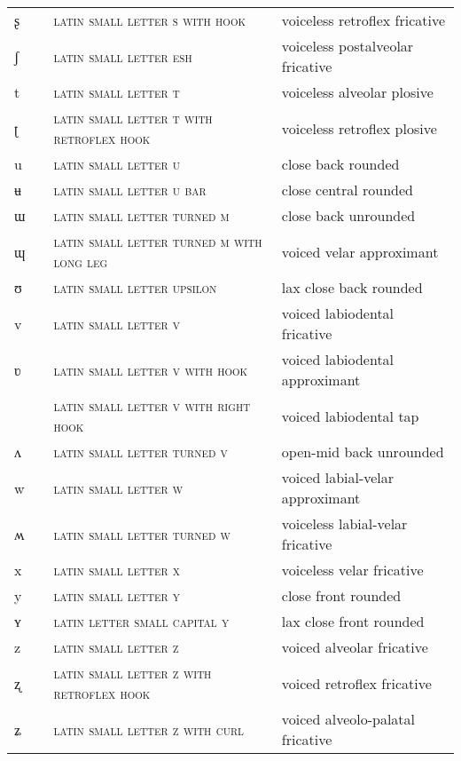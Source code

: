 \begin{center}
\begin{xtabular}{ l L{1.2cm} L{5.4cm} L{4.2cm} }
ʂ &  & \textsc{latin small letter s with hook} & voiceless retroflex fricative \\ 
ʃ &  & \textsc{latin small letter esh} & voiceless postalveolar fricative \\ 
t &  & \textsc{latin small letter t} & voiceless alveolar plosive \\ 
ʈ &  & \textsc{latin small letter t with retroflex hook} & voiceless retroflex plosive \\ 
u &  & \textsc{latin small letter u} & close back rounded \\ 
ʉ &  & \textsc{latin small letter u bar} & close central rounded \\ 
ɯ &  & \textsc{latin small letter turned m} & close back unrounded \\ 
ɰ &  & \textsc{latin small letter turned m with long leg} & voiced velar approximant \\ 
ʊ &  & \textsc{latin small letter upsilon} & lax close back rounded \\ 
v &  & \textsc{latin small letter v} & voiced labiodental fricative \\ 
ʋ &  & \textsc{latin small letter v with hook} & voiced labiodental approximant \\ 
 &  & \textsc{latin small letter v with right hook} & voiced labiodental tap \\ 
ʌ &  & \textsc{latin small letter turned v} & open-mid back unrounded \\ 
w &  & \textsc{latin small letter w} & voiced labial-velar approximant \\ 
ʍ &  & \textsc{latin small letter turned w} & voiceless labial-velar fricative \\ 
x &  & \textsc{latin small letter x} & voiceless velar fricative \\ 
y &  & \textsc{latin small letter y} & close front rounded \\ 
ʏ &  & \textsc{latin letter small capital y} & lax close front rounded \\ 
z &  & \textsc{latin small letter z} & voiced alveolar fricative \\ 
ʐ &  & \textsc{latin small letter z with retroflex hook} & voiced retroflex fricative \\ 
ʑ &  & \textsc{latin small letter z with curl} & voiced alveolo-palatal fricative \\ 

\end{xtabular}
\end{center}
